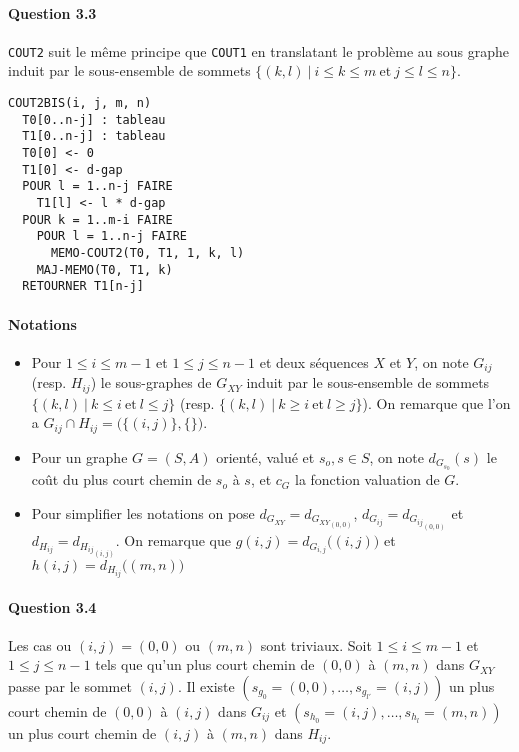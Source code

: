 \paragraph{Question 3.3}
\verb'COUT2' suit le m\^eme principe que \verb'COUT1' en translatant
le probl\`eme au sous graphe induit par le sous-ensemble de sommets
$\big\{(k,l)\ \big|\ i\leq k\leq m\ \text{et}\ j\leq l\leq n\big\}$.
\begin{verbatim}
COUT2BIS(i, j, m, n)
  T0[0..n-j] : tableau
  T1[0..n-j] : tableau
  T0[0] <- 0
  T1[0] <- d-gap
  POUR l = 1..n-j FAIRE
    T1[l] <- l * d-gap
  POUR k = 1..m-i FAIRE
    POUR l = 1..n-j FAIRE
      MEMO-COUT2(T0, T1, 1, k, l)
    MAJ-MEMO(T0, T1, k)
  RETOURNER T1[n-j]
\end{verbatim}
\paragraph{Notations}
\begin{itemize}
\item Pour $1\leq i\leq m-1$ et $1\leq j\leq n-1$ et deux s\'equences
  $X$ et $Y$, on note $G_{ij}$ (resp. $H_{ij}$) le sous-graphes de
  $G_{XY}$ induit par le sous-ensemble de sommets
  $\big\{(k,l)\ |\ k\leq i\ \text{et}\ l\leq j\big\}$
  (resp. $\big\{(k,l)\ |\ k\geq i\ \text{et}\ l\geq j\big\}$).
  On remarque que l'on a $G_{ij}\cap H_{ij}=\big(\{(i,j)\},\{\}\big)$.
\item Pour un graphe $G=(S,A)$ orient\'e, valu\'e et $s_o,s\in S$, on
  note $d_{G_{s_0}}(s)$ le co\^ut du plus court chemin de $s_o$ \`a
  $s$, et $c_G$ la fonction valuation de $G$.
\item Pour simplifier les notations on pose
  $d_{G_{XY}}=d_{{G_{XY}}_{(0,0)}}$, $d_{G_{ij}}=d_{{G_{ij}}_{(0,0)}}$
  et $d_{H_{ij}}=d_{{H_{ij}}_{(i,j)}}$. On remarque que
  $g(i,j)=d_{G_{i,j}}\big((i,j)\big)$ et
  $h(i,j)=d_{H_{ij}}\big((m,n)\big)$
\end{itemize}

\paragraph{Question 3.4}
Les cas ou $(i,j)=(0,0)$ ou $(m,n)$ sont triviaux. Soit
$1\leq i\leq m-1$ et $1\leq j\leq n-1$ tels que qu'un plus court
chemin de $(0,0)$ \`a $(m,n)$ dans $G_{XY}$ passe par le sommet
$(i,j)$. Il existe $(s_{g_0}=(0,0),\ldots,s_{g_{l'}}=(i,j))$ un plus
court chemin de $(0,0)$ \`a $(i,j)$ dans $G_{ij}$ et
$(s_{h_0}=(i,j),\ldots,s_{h_l}=(m,n))$ un plus court chemin de $(i,j)$
\`a $(m,n)$ dans $H_{ij}$.


